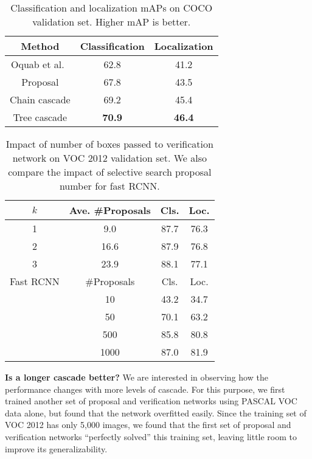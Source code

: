\documentclass[10pt,twocolumn,letterpaper]{article}
\begin{document}
\begin{table}
\small
\center
\begin{tabular}{ccc}
\hline
Method & Classification & Localization\\
\hline
Oquab et al.~\cite{Oquab_2015_CVPR} & 62.8 & 41.2\\
\rowcolor{gray!30}Proposal & 67.8 & 43.5\\
Chain cascade & 69.2 & 45.4\\
\rowcolor{gray!30}Tree cascade & \textbf{70.9} & \textbf{46.4}\\
\hline
\end{tabular}
\caption{Classification and localization mAPs on COCO validation set. Higher mAP is better.}
\label{tab:coco_result}
\end{table}


\begin{table}
\small
\center
\begin{tabular}{cccc}
\hline
$k$ & Ave. \#Proposals & Cls. & Loc.\\
\hline
\rowcolor{gray!30}1 & 9.0 & 87.7 & 76.3\\
2 & 16.6 & 87.9 & 76.8\\
\rowcolor{gray!30}3 & 23.9 & 88.1 & 77.1\\
\hline
\hline
Fast RCNN & \#Proposals & Cls. & Loc.\\
\hline
\rowcolor{gray!30}&10&43.2&34.7\\
&50&70.1&63.2\\
\rowcolor{gray!30}&500&85.8&80.8\\
&1000&87.0&81.9\\
\hline
\end{tabular}
\caption{Impact of number of boxes passed to verification network on VOC 2012 validation set. We also compare the impact of selective search proposal number for fast RCNN.}
\label{tab:proposal_number}
\end{table}







\textbf{Is a longer cascade better?} We are interested in observing how the performance changes with more levels of cascade. For this purpose, we first trained another set of proposal and verification networks using PASCAL VOC data alone, but found that the network overfitted easily. Since the training set of VOC 2012 has only 5,000 images, we found that the first set of proposal and verification networks ``perfectly solved'' this training set, leaving little room to improve its generalizability.
\end{document}
